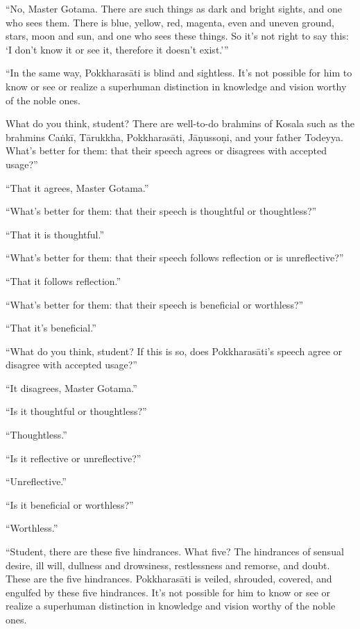 \documentclass[12pt,openany]{book}%
\begin{document}
“No, Master Gotama. There are such things as dark and bright sights, and one who sees them. There is blue, yellow, red, magenta, even and uneven ground, stars, moon and sun, and one who sees these things. So it’s not right to say this: ‘I don’t know it or see it, therefore it doesn’t exist.’” 

“In the same way, \textsanskrit{Pokkharasāti} is blind and sightless. It’s not possible for him to know or see or realize a superhuman distinction in knowledge and vision worthy of the noble ones. 

What do you think, student? There are well-to-do brahmins of Kosala such as the brahmins \textsanskrit{Caṅkī}, \textsanskrit{Tārukkha}, \textsanskrit{Pokkharasāti}, \textsanskrit{Jāṇussoṇi}, and your father Todeyya. What’s better for them: that their speech agrees or disagrees with accepted usage?” 

“That it agrees, Master Gotama.” 

“What’s better for them: that their speech is thoughtful or thoughtless?” 

“That it is thoughtful.” 

“What’s better for them: that their speech follows reflection or is unreflective?” 

“That it follows reflection.” 

“What’s better for them: that their speech is beneficial or worthless?” 

“That it’s beneficial.” 

“What do you think, student? If this is so, does \textsanskrit{Pokkharasāti}’s speech agree or disagree with accepted usage?” 

“It disagrees, Master Gotama.” 

“Is it thoughtful or thoughtless?” 

“Thoughtless.” 

“Is it reflective or unreflective?” 

“Unreflective.” 

“Is it beneficial or worthless?” 

“Worthless.” 

“Student, there are these five hindrances. What five? The hindrances of sensual desire, ill will, dullness and drowsiness, restlessness and remorse, and doubt. These are the five hindrances. \textsanskrit{Pokkharasāti} is veiled, shrouded, covered, and engulfed by these five hindrances. It’s not possible for him to know or see or realize a superhuman distinction in knowledge and vision worthy of the noble ones. 
\end{document}
